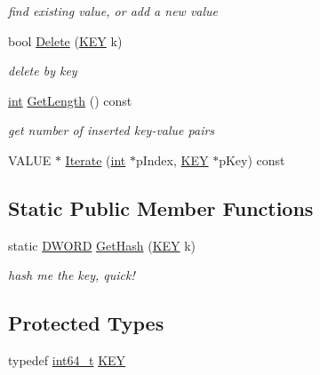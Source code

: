 \begin{DoxyCompactItemize}
\begin{DoxyCompactList}\small\item\em find existing value, or add a new value \end{DoxyCompactList}\item 
bool \hyperlink{classCSphHash_ae387782364ed27a36b3bb0c6aa459ace}{Delete} (\hyperlink{classCSphHash_a59a1412d2e0498b2a7417c7adf5d7041}{K\-E\-Y} k)
\begin{DoxyCompactList}\small\item\em delete by key \end{DoxyCompactList}\item 
\hyperlink{sphinxexpr_8cpp_a4a26e8f9cb8b736e0c4cbf4d16de985e}{int} \hyperlink{classCSphHash_ab105a3bc8ee8d372025f3f8d2b7fcc6b}{Get\-Length} () const 
\begin{DoxyCompactList}\small\item\em get number of inserted key-\/value pairs \end{DoxyCompactList}\item 
V\-A\-L\-U\-E $\ast$ \hyperlink{classCSphHash_a3147dd93e50a9773d1a9f812192c1af6}{Iterate} (\hyperlink{sphinxexpr_8cpp_a4a26e8f9cb8b736e0c4cbf4d16de985e}{int} $\ast$p\-Index, \hyperlink{classCSphHash_a59a1412d2e0498b2a7417c7adf5d7041}{K\-E\-Y} $\ast$p\-Key) const 
\end{DoxyCompactItemize}
\subsection*{Static Public Member Functions}
\begin{DoxyCompactItemize}
\item 
static \hyperlink{sphinxstd_8h_a798af1e30bc65f319c1a246cecf59e39}{D\-W\-O\-R\-D} \hyperlink{classCSphHash_ae3302eb8d33838f5f55f24f3a9595c0c}{Get\-Hash} (\hyperlink{classCSphHash_a59a1412d2e0498b2a7417c7adf5d7041}{K\-E\-Y} k)
\begin{DoxyCompactList}\small\item\em hash me the key, quick! \end{DoxyCompactList}\end{DoxyCompactItemize}
\subsection*{Protected Types}
\begin{DoxyCompactItemize}
\item 
typedef \hyperlink{sphinxstd_8h_a996e72f71b11a5bb8b3b7b6936b1516d}{int64\-\_\-t} \hyperlink{classCSphHash_a59a1412d2e0498b2a7417c7adf5d7041}{K\-E\-Y}
\end{DoxyCompactItemize}
